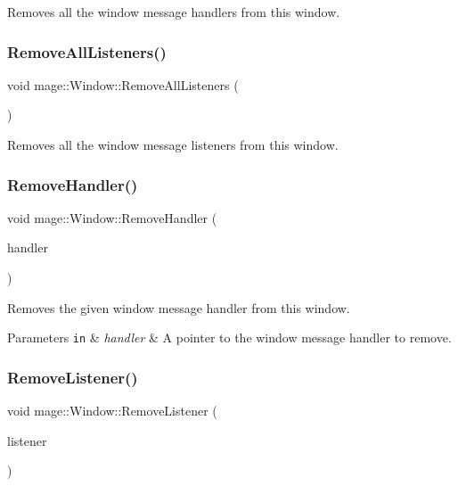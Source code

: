 Removes all the window message handlers from this window. \hypertarget{classmage_1_1_window_a1bb37381e94c541027d1ee4da7f6c7e2}{}\label{classmage_1_1_window_a1bb37381e94c541027d1ee4da7f6c7e2} 
\subsubsection{\texorpdfstring{Remove\+All\+Listeners()}{RemoveAllListeners()}}
{\footnotesize\ttfamily void mage\+::\+Window\+::\+Remove\+All\+Listeners (\begin{DoxyParamCaption}{ }\end{DoxyParamCaption})\hspace{0.3cm}{\ttfamily [noexcept]}}

Removes all the window message listeners from this window. \hypertarget{classmage_1_1_window_a81b23a696f73636ec9aa985ceda391b4}{}\label{classmage_1_1_window_a81b23a696f73636ec9aa985ceda391b4} 
\subsubsection{\texorpdfstring{Remove\+Handler()}{RemoveHandler()}}
{\footnotesize\ttfamily void mage\+::\+Window\+::\+Remove\+Handler (\begin{DoxyParamCaption}\item[{\hyperlink{classmage_1_1_window_add1d792fb9f71e70d4fb07409d80cfdd}{Window\+Message\+Handler\+Ptr}}]{handler }\end{DoxyParamCaption})}

Removes the given window message handler from this window.


\begin{DoxyParams}[1]{Parameters}
\mbox{\tt in}  & {\em handler} & A pointer to the window message handler to remove. \\
\hline
\end{DoxyParams}
\hypertarget{classmage_1_1_window_a0f30903e406cf3cde3682befafcd3eba}{}\label{classmage_1_1_window_a0f30903e406cf3cde3682befafcd3eba} 
\subsubsection{\texorpdfstring{Remove\+Listener()}{RemoveListener()}}
{\footnotesize\ttfamily void mage\+::\+Window\+::\+Remove\+Listener (\begin{DoxyParamCaption}\item[{\hyperlink{classmage_1_1_window_a0e0a4f2a3f6db176f6aec454b94a06fb}{Window\+Message\+Listener\+Ptr}}]{listener }\end{DoxyParamCaption})}

